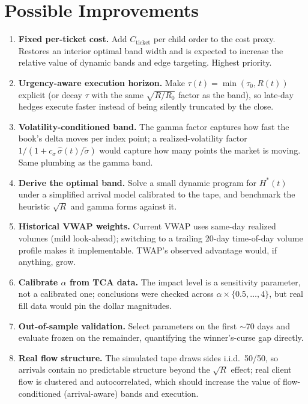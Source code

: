 \documentclass[11pt]{article}
\begin{document}
\section{Possible Improvements}

\begin{enumerate}
\item \textbf{Fixed per-ticket cost.} Add $C_{\text{ticket}}$ per child order to the
  cost proxy. Restores an interior optimal band width and is expected to increase the
  relative value of dynamic bands and edge targeting. Highest priority.
\item \textbf{Urgency-aware execution horizon.} Make $\tau(t) = \min(\tau_0, R(t))$
  explicit (or decay $\tau$ with the same $\sqrt{R/R_0}$ factor as the band), so
  late-day hedges execute faster instead of being silently truncated by the close.
\item \textbf{Volatility-conditioned band.} The gamma factor captures how fast the
  book's delta moves per index point; a realized-volatility factor
  $1/(1 + c_\sigma\,\hat\sigma(t)/\tilde\sigma)$ would capture how many points the
  market is moving. Same plumbing as the gamma band.
\item \textbf{Derive the optimal band.} Solve a small dynamic program for $H^{*}(t)$
  under a simplified arrival model calibrated to the tape, and benchmark the heuristic
  $\sqrt{R}$ and gamma forms against it.
\item \textbf{Historical VWAP weights.} Current VWAP uses same-day realized volumes
  (mild look-ahead); switching to a trailing 20-day time-of-day volume profile makes it
  implementable. TWAP's observed advantage would, if anything, grow.
\item \textbf{Calibrate $\alpha$ from TCA data.} The impact level is a sensitivity
  parameter, not a calibrated one; conclusions were checked across $\alpha \times
  \{0.5,\dots,4\}$, but real fill data would pin the dollar magnitudes.
\item \textbf{Out-of-sample validation.} Select parameters on the first $\sim$70 days
  and evaluate frozen on the remainder, quantifying the winner's-curse gap directly.
\item \textbf{Real flow structure.} The simulated tape draws sides i.i.d.\ 50/50, so
  arrivals contain no predictable structure beyond the $\sqrt{R}$ effect; real client
  flow is clustered and autocorrelated, which should increase the value of
  flow-conditioned (arrival-aware) bands and execution.
\end{enumerate}
\end{document}
